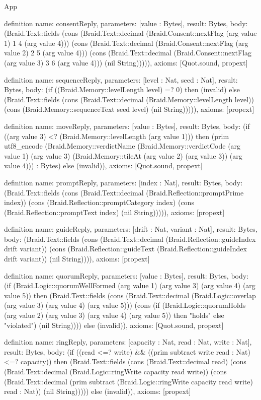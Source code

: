 \begin{lexlean}{App}
\begin{semanticmodule}
definition{
  name: consentReply,
  parameters: [value : Bytes],
  result: Bytes,
  body: (Braid.Text::fields (cons (Braid.Text::decimal (Braid.Consent::nextFlag (arg value 1) 1 4 (arg value 4))) (cons (Braid.Text::decimal (Braid.Consent::nextFlag (arg value 2) 2 5 (arg value 4))) (cons (Braid.Text::decimal (Braid.Consent::nextFlag (arg value 3) 3 6 (arg value 4))) (nil String))))),
  axioms: [Quot.sound, propext]
}

definition{
  name: sequenceReply,
  parameters: [level : Nat, seed : Nat],
  result: Bytes,
  body: (if ((Braid.Memory::levelLength level) =? 0) then (invalid) else (Braid.Text::fields (cons (Braid.Text::decimal (Braid.Memory::levelLength level)) (cons (Braid.Memory::sequenceText seed level) (nil String))))),
  axioms: [propext]
}

definition{
  name: moveReply,
  parameters: [value : Bytes],
  result: Bytes,
  body: (if ((arg value 3) <? (Braid.Memory::levelLength (arg value 1))) then (prim utf8_encode (Braid.Memory::verdictName (Braid.Memory::verdictCode (arg value 1) (arg value 3) (Braid.Memory::tileAt (arg value 2) (arg value 3)) (arg value 4))) : Bytes) else (invalid)),
  axioms: [Quot.sound, propext]
}

definition{
  name: promptReply,
  parameters: [index : Nat],
  result: Bytes,
  body: (Braid.Text::fields (cons (Braid.Text::decimal (Braid.Reflection::promptPrime index)) (cons (Braid.Reflection::promptCategory index) (cons (Braid.Reflection::promptText index) (nil String))))),
  axioms: [propext]
}

definition{
  name: guideReply,
  parameters: [drift : Nat, variant : Nat],
  result: Bytes,
  body: (Braid.Text::fields (cons (Braid.Text::decimal (Braid.Reflection::guideIndex drift variant)) (cons (Braid.Reflection::guideText (Braid.Reflection::guideIndex drift variant)) (nil String)))),
  axioms: [propext]
}

definition{
  name: quorumReply,
  parameters: [value : Bytes],
  result: Bytes,
  body: (if (Braid.Logic::quorumWellFormed (arg value 1) (arg value 3) (arg value 4) (arg value 5)) then (Braid.Text::fields (cons (Braid.Text::decimal (Braid.Logic::overlap (arg value 3) (arg value 4) (arg value 5))) (cons (if (Braid.Logic::quorumHolds (arg value 2) (arg value 3) (arg value 4) (arg value 5)) then "holds" else "violated") (nil String)))) else (invalid)),
  axioms: [Quot.sound, propext]
}

definition{
  name: ringReply,
  parameters: [capacity : Nat, read : Nat, write : Nat],
  result: Bytes,
  body: (if ((read <=? write) && ((prim subtract write read : Nat) <=? capacity)) then (Braid.Text::fields (cons (Braid.Text::decimal read) (cons (Braid.Text::decimal (Braid.Logic::ringWrite capacity read write)) (cons (Braid.Text::decimal (prim subtract (Braid.Logic::ringWrite capacity read write) read : Nat)) (nil String))))) else (invalid)),
  axioms: [propext]
}


\end{semanticmodule}
\end{lexlean}
